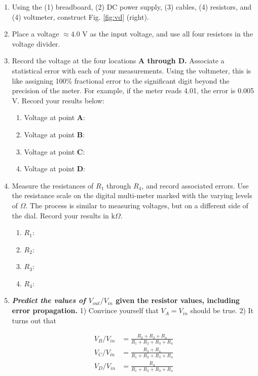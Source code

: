 \documentclass[12pt]{article}
\begin{document}
\begin{enumerate}
\item Using the (1) breadboard, (2) DC power supply, (3) cables, (4) resistors, and (4) voltmeter, construct Fig. \ref{fig:vd} (right).
\item Place a voltage $\approx 4.0$ V as the input voltage, and use all four resistors in the voltage divider.
\item Record the voltage at the four locations \textbf{A through D.}  Associate a statistical error with each of your measurements.  Using the voltmeter, this is like assigning 100\% fractional error to the significant digit beyond the precision of the meter.  For example, if the meter reads 4.01, the error is 0.005 V.  Record your results below:
\begin{enumerate}
\item Voltage at point \textbf{A}:
\item Voltage at point \textbf{B}:
\item Voltage at point \textbf{C}:
\item Voltage at point \textbf{D}:
\end{enumerate}
\item Measure the resistances of $R_1$ through $R_4$, and record associated errors.  Use the resistance scale on the digital multi-meter marked with the varying levels of $\Omega$.  The process is similar to measuring voltages, but on a different side of the dial.  Record your results in k$\Omega$.
\begin{enumerate}
\item $R_1$: 
\item $R_2$: 
\item $R_3$: 
\item $R_4$: 
\end{enumerate}
\item \textbf{\textit{Predict the values of $V_{out}/V_{in}$} given the resistor values, including error propagation.}  1) Convince yourself that $V_A = V_{in}$ should be true.  2) It turns out that

\begin{align}
V_B/V_{in} &= \frac{R_2 + R_3 + R_4}{R_1 + R_2 + R_3 + R_4} \\
V_C/V_{in} &= \frac{R_3 + R_4}{R_1 + R_2 + R_3 + R_4} \\
V_D/V_{in} &= \frac{R_4}{R_1 + R_2 + R_3 + R_4}
\end{align}


\end{enumerate}
\end{document}
